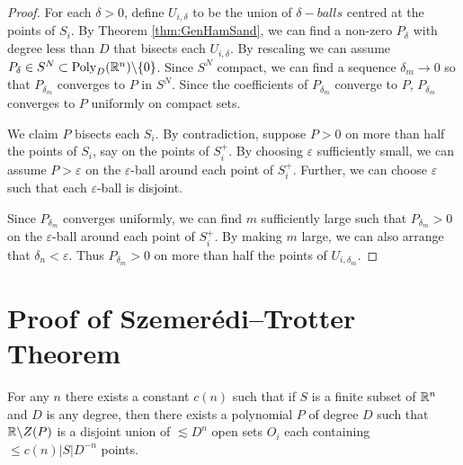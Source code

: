 \begin{proof}
    For each $\delta>0$, define $U_{i, \delta}$ to be the union of $\delta-balls$ centred at the points of $S_i$. By Theorem \ref{thm:GenHamSand}, we can find a non-zero $P_{\delta}$ with degree less than $D$ that bisects each $U_{i, \delta}$. By rescaling we can assume $P_{\delta} \in S^N \subset \text{Poly}_D (\mathbb R^n) \backslash \{0\}$.
    Since $S^N$ compact, we can find a sequence $\delta_m \to 0$ so that $P_{\delta_{m}}$ converges to $P$ in $S^N$. Since the coefficients of $P_{\delta_{m}}$ converge to $P$, $P_{\delta_{m}}$ converges to $P$ uniformly on compact sets.

    We claim $P$ bisects each $S_i$. By contradiction, suppose $P>0$ on more than half the points of $S_i$, say on the points of $S_i^+$. By choosing $\varepsilon$ sufficiently small, we can assume $P>\varepsilon$ on the $\varepsilon$-ball around each point of $S_i^+$.
    Further, we can choose $\varepsilon$ such that each $\varepsilon$-ball is disjoint. 

    Since $P_{\delta_{m}}$ converges uniformly, we can find $m$ sufficiently large such that $P_{\delta_{m}}>0$ on the $\varepsilon$-ball around each point of $S_i^+$. By making $m$ large, we can also arrange that $\delta_n < \varepsilon$.
    Thus $P_{\delta_{m}} > 0$ on more than half the points of $U_{i, \delta_{m}}$.
\end{proof}
\section{Proof of Szemerédi–Trotter Theorem}
\begin{theorem}
   For any $n$ there exists a constant $c(n)$ such that if $S$ is a finite subset of $\mathbb R^n$ and $D$ is any degree, then there exists
   a polynomial $P$ of degree $D$ such that $\mathbb R \backslash Z(P)$ is a disjoint union of $\lesssim D^n$ open sets $O_i$ each containing
   $\leq c(n) |S|D^{-n}$ points. \label{thm:PolyPartioning}
\end{theorem}

